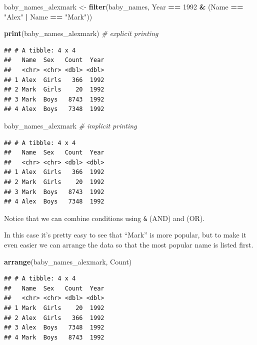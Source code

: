 \documentclass[
]{book}
\newenvironment{Shaded}{\begin{snugshade}}{\end{snugshade}}
\newcommand{\CommentTok}[1]{\textcolor[rgb]{0.56,0.35,0.01}{\textit{#1}}}
\newcommand{\DecValTok}[1]{\textcolor[rgb]{0.00,0.00,0.81}{#1}}
\newcommand{\KeywordTok}[1]{\textcolor[rgb]{0.13,0.29,0.53}{\textbf{#1}}}
\newcommand{\NormalTok}[1]{#1}
\newcommand{\OperatorTok}[1]{\textcolor[rgb]{0.81,0.36,0.00}{\textbf{#1}}}
\newcommand{\StringTok}[1]{\textcolor[rgb]{0.31,0.60,0.02}{#1}}
\begin{document}
\begin{Shaded}
\begin{Highlighting}[]
\NormalTok{baby_names_alexmark <-}\StringTok{ }\KeywordTok{filter}\NormalTok{(baby_names, }
\NormalTok{             Year }\OperatorTok{==}\StringTok{ }\DecValTok{1992} \OperatorTok{&}\StringTok{ }\NormalTok{(Name }\OperatorTok{==}\StringTok{ "Alex"} \OperatorTok{|}\StringTok{ }\NormalTok{Name }\OperatorTok{==}\StringTok{ "Mark"}\NormalTok{))}

\KeywordTok{print}\NormalTok{(baby_names_alexmark) }\CommentTok{# explicit printing}
\end{Highlighting}
\end{Shaded}

\begin{verbatim}
## # A tibble: 4 x 4
##   Name  Sex   Count  Year
##   <chr> <chr> <dbl> <dbl>
## 1 Alex  Girls   366  1992
## 2 Mark  Girls    20  1992
## 3 Mark  Boys   8743  1992
## 4 Alex  Boys   7348  1992
\end{verbatim}

\begin{Shaded}
\begin{Highlighting}[]
\NormalTok{baby_names_alexmark }\CommentTok{# implicit printing}
\end{Highlighting}
\end{Shaded}

\begin{verbatim}
## # A tibble: 4 x 4
##   Name  Sex   Count  Year
##   <chr> <chr> <dbl> <dbl>
## 1 Alex  Girls   366  1992
## 2 Mark  Girls    20  1992
## 3 Mark  Boys   8743  1992
## 4 Alex  Boys   7348  1992
\end{verbatim}

Notice that we can combine conditions using \texttt{\&} (AND)
and \texttt{\textbar{}} (OR).

In this case it's pretty easy to see that ``Mark'' is more popular,
but to make it even easier we can arrange the data so that the
most popular name is listed first.

\begin{Shaded}
\begin{Highlighting}[]
\KeywordTok{arrange}\NormalTok{(baby_names_alexmark, Count)}
\end{Highlighting}
\end{Shaded}

\begin{verbatim}
## # A tibble: 4 x 4
##   Name  Sex   Count  Year
##   <chr> <chr> <dbl> <dbl>
## 1 Mark  Girls    20  1992
## 2 Alex  Girls   366  1992
## 3 Alex  Boys   7348  1992
## 4 Mark  Boys   8743  1992
\end{verbatim}
\end{document}
